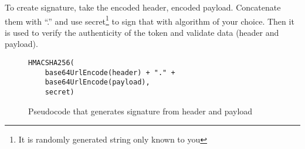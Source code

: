 To create signature, take the encoded header, encoded payload. Concatenate them
with ``.'' and use secret\footnote{It is randomly generated string only known
to you} to sign that with algorithm of your choice. Then it is used to verify
the authenticity of the token and validate data (header and payload).

\begin{figure}[!htbp]
\begin{verbatim}
HMACSHA256(
    base64UrlEncode(header) + "." +
    base64UrlEncode(payload),
    secret)
\end{verbatim}
\renewcommand\figurename{Code}
\caption{Pseudocode that generates signature from header and payload}
\label{src:signature}
\end{figure}

